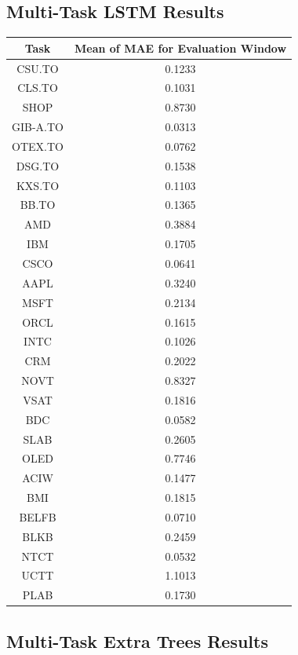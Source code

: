 \documentclass[conference]{IEEEtran}
\begin{document}
\clearpage
\subsection{Multi-Task LSTM Results}
\label{mtl_lstm_results}

\begin{tabular}{c c}
\hline
Task & Mean of MAE for Evaluation Window \\
\hline
CSU.TO & 0.1233 \\
CLS.TO &0.1031 \\
SHOP &  0.8730 \\
GIB-A.TO & 0.0313 \\
OTEX.TO &0.0762 \\
DSG.TO &  0.1538 \\
KXS.TO &  0.1103 \\
BB.TO &  0.1365 \\
AMD &  0.3884 \\
IBM & 0.1705 \\
CSCO &  0.0641 \\
AAPL &  0.3240 \\
MSFT &  0.2134 \\
ORCL & 0.1615 \\
INTC &  0.1026 \\
CRM &  0.2022 \\
NOVT &  0.8327 \\
VSAT &  0.1816 \\
BDC & 0.0582 \\
SLAB &  0.2605 \\
OLED & 0.7746 \\
ACIW & 0.1477 \\
BMI &  0.1815 \\
BELFB & 0.0710 \\
BLKB & 0.2459 \\
NTCT &  0.0532 \\
UCTT & 1.1013 \\
PLAB &  0.1730 \\
\hline
\end{tabular}

\clearpage
\subsection{Multi-Task Extra Trees Results}
\label{mtl_et_result}
\end{document}
